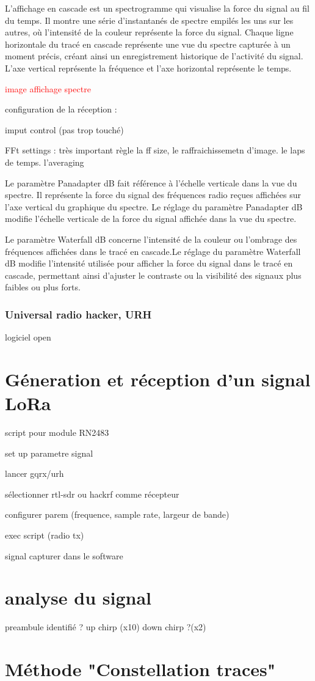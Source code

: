 L'affichage en cascade est un spectrogramme qui visualise la force du signal au fil du temps.
Il montre une série d'instantanés de spectre empilés les uns sur les autres, où l'intensité de la couleur représente la force du signal.
Chaque ligne horizontale du tracé en cascade représente une vue du spectre capturée à un moment précis, créant ainsi un enregistrement historique de l'activité du signal.
L'axe vertical représente la fréquence et l'axe horizontal représente le temps.

\textcolor{red}{image affichage spectre}

configuration de la réception :

imput control (pas trop touché)

FFt settings : très important règle la ff size, le raffraichissemetn d'image. le laps de temps. l'averaging

Le paramètre Panadapter dB fait référence à l'échelle verticale dans la vue du spectre. Il représente la force du signal des fréquences radio reçues affichées sur l'axe vertical du graphique du spectre. Le réglage du paramètre Panadapter dB modifie l’échelle verticale de la force du signal affichée dans la vue du spectre.

Le paramètre Waterfall dB concerne l'intensité de la couleur ou l'ombrage des fréquences affichées dans le tracé en cascade.Le réglage du paramètre Waterfall dB modifie l'intensité utilisée pour afficher la force du signal dans le tracé en cascade, permettant ainsi d'ajuster le contraste ou la visibilité des signaux plus faibles ou plus forts.


\subsubsection{Universal radio hacker, URH}

logiciel open

\section{Géneration et réception d'un signal LoRa}

script pour module RN2483

set up parametre signal

lancer gqrx/urh

sélectionner rtl-sdr ou hackrf comme récepteur

configurer parem (frequence, sample rate, largeur de bande)

exec script (radio tx)

signal capturer dans le software

\section{analyse du signal}

preambule identifié ? up chirp (x10) down chirp ?(x2)

\section{Méthode "Constellation traces"}